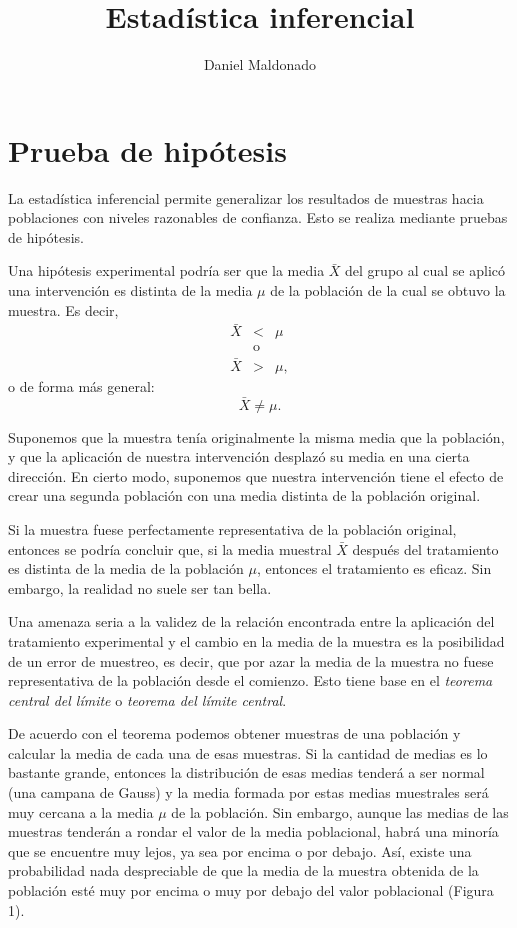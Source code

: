 \documentclass[a4paper,12pt]{article}
\title{Estadística inferencial}
\author{Daniel Maldonado}
\date{}
\begin{document}
{\scshape\bfseries \maketitle}

\section{Prueba de hipótesis}\label{pruebahipotesis}

La estadística inferencial permite generalizar los resultados de muestras hacia poblaciones con niveles razonables de confianza. Esto se realiza mediante pruebas de hipótesis.

Una hipótesis experimental podría ser que la media $\bar{X}$ del grupo al cual se aplicó una intervención es distinta de la media $\mu$ de la población de la cual se obtuvo la muestra. Es decir,
\begin{eqnarray*}
  \bar{X} &<& \mu\\
          &\mbox{o}&\\
  \bar{X} &>& \mu,
\end{eqnarray*}
o de forma más general:
\[
  \bar{X} \neq \mu
.\]

Suponemos que la muestra tenía originalmente la misma media que la población, y que la aplicación de nuestra intervención desplazó su media en una cierta dirección. En cierto modo, suponemos que nuestra intervención tiene el efecto de crear una segunda población con una media distinta de la población original.

Si la muestra fuese perfectamente representativa de la población original, entonces se podría concluir que, si la media muestral $\bar{X}$ después del tratamiento es distinta de la media de la población $\mu$, entonces el tratamiento es eficaz. Sin embargo, la realidad no suele ser tan bella.

Una amenaza seria a la validez de la relación encontrada entre la aplicación del tratamiento experimental y el cambio en la media de la muestra es la posibilidad de un error de muestreo, es decir, que por azar la media de la muestra no fuese representativa de la población desde el comienzo. Esto tiene base en el {\slshape teorema central del límite} o {\slshape teorema del límite central}.

De acuerdo con el teorema podemos obtener muestras de una población y calcular la media de cada una de esas muestras. Si la cantidad de medias es lo bastante grande, entonces la distribución de esas medias tenderá a ser normal (una campana de Gauss) y la media formada por estas medias muestrales será muy cercana a la media $\mu$ de la población. Sin embargo, aunque las medias de las muestras tenderán a rondar el valor de la media poblacional, habrá una minoría que se encuentre muy lejos, ya sea por encima o por debajo. Así, existe una probabilidad nada despreciable de que la media de la muestra obtenida de la población esté muy por encima o muy por debajo del valor poblacional (Figura 1).
\end{document}
